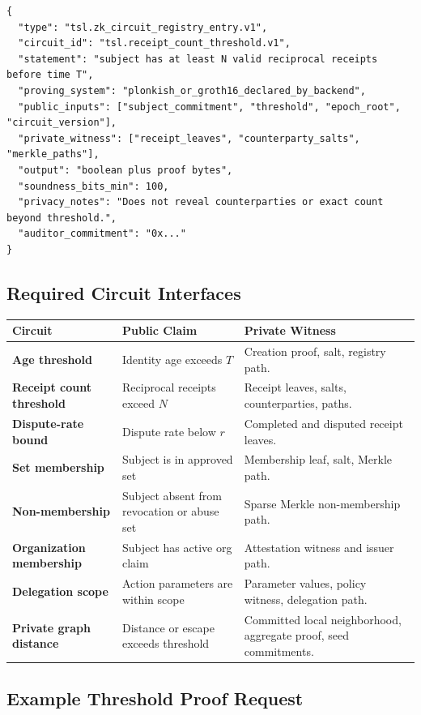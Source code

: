 \documentclass[11pt]{article}
\begin{document}
\begin{lstlisting}[style=tslcode]
{
  "type": "tsl.zk_circuit_registry_entry.v1",
  "circuit_id": "tsl.receipt_count_threshold.v1",
  "statement": "subject has at least N valid reciprocal receipts before time T",
  "proving_system": "plonkish_or_groth16_declared_by_backend",
  "public_inputs": ["subject_commitment", "threshold", "epoch_root", "circuit_version"],
  "private_witness": ["receipt_leaves", "counterparty_salts", "merkle_paths"],
  "output": "boolean plus proof bytes",
  "soundness_bits_min": 100,
  "privacy_notes": "Does not reveal counterparties or exact count beyond threshold.",
  "auditor_commitment": "0x..."
}
\end{lstlisting}

\subsection{Required Circuit Interfaces}

\begin{longtable}{>{\bfseries}p{} p{} p{}}
\toprule
Circuit & Public Claim & Private Witness \\
\midrule
Age threshold & Identity age exceeds \(T\) & Creation proof, salt, registry path. \\
Receipt count threshold & Reciprocal receipts exceed \(N\) & Receipt leaves, salts, counterparties, paths. \\
Dispute-rate bound & Dispute rate below \(r\) & Completed and disputed receipt leaves. \\
Set membership & Subject is in approved set & Membership leaf, salt, Merkle path. \\
Non-membership & Subject absent from revocation or abuse set & Sparse Merkle non-membership path. \\
Organization membership & Subject has active org claim & Attestation witness and issuer path. \\
Delegation scope & Action parameters are within scope & Parameter values, policy witness, delegation path. \\
Private graph distance & Distance or escape exceeds threshold & Committed local neighborhood, aggregate proof, seed commitments. \\
\bottomrule
\end{longtable}

\subsection{Example Threshold Proof Request}
\end{document}
